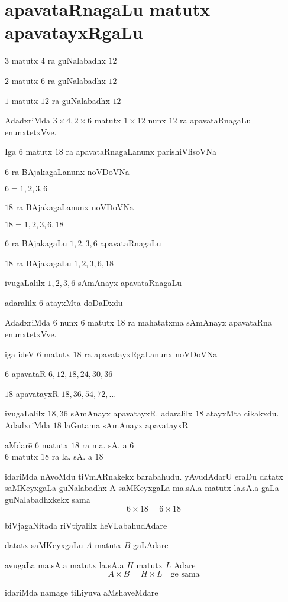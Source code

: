 \chapter{apavataRnagaLu matutx apavatayxRgaLu}


$3$ matutx $4$ ra guNalabadhx $12$

$2$ matutx $6$ ra guNalabadhx $12$

$1$ matutx $12$ ra guNalabadhx $12$

AdadxriMda $3\times4, 2\times 6 $ matutx $1\times 12$ nunx $12$ ra apavataRnagaLu enunxtetxVve.

Iga $6$ matutx $18$ ra apavataRnagaLanunx parishiVlisoVNa 

$6$ ra BAjakagaLanunx noVDoVNa

$6=1,2,3,6$ 

$18$ ra BAjakagaLanunx noVDoVNa

$18=1,2,3,6,18$

$6$ ra BAjakagaLu $1,2,3,6$ \qquad apavataRnagaLu

$18$ ra BAjakagaLu $1,2,3,6,18$

ivugaLalilx $1,2,3,6$ sAmAnayx apavataRnagaLu 

adaralilx $6$ atayxMta doDaDxdu

AdadxriMda $6$ nunx $6$ matutx $18$ ra mahatatxma sAmAnayx apavataRna enunxtetxVve. 

iga ideV $6$ matutx $18$ ra apavatayxRgaLanunx noVDoVNa 

$6$ apavataR $6,12,18,24,30,36$

$18$ apavatayxR $18,36,54,72,\ldots$

ivugaLalilx $18, 36$ sAmAnayx apavatayxR. adaralilx $18$ atayxMta cikakxdu. AdadxriMda $18$ laGutama sAmAnayx apavatayxR
\begin{tabbing}
aMdare\qquad \= $6$ matutx $18$ ra ma. sA. a $6$\\
\> $6$ matutx $18$ ra la. sA. a $18$
\end{tabbing}
idariMda nAvoMdu tiVmARnakekx barabahudu. yAvudAdarU eraDu datatx saMKeyxgaLa guNalabadhx A saMKeyxgaLa ma.sA.a matutx la.sA.a gaLa guNalabadhxkekx sama
$$
6\times 18 = 6 \times 18
$$

biVjagaNitada riVtiyalilx heVLabahudAdare

datatx saMKeyxgaLu $A$ matutx $B$ gaLAdare

avugaLa ma.sA.a matutx la.sA.a  $H$ matutx $L$ Adare
$$
A\times B = H\times L \quad \text{ge sama}
$$

idariMda namage tiLiyuva aMshaveMdare

